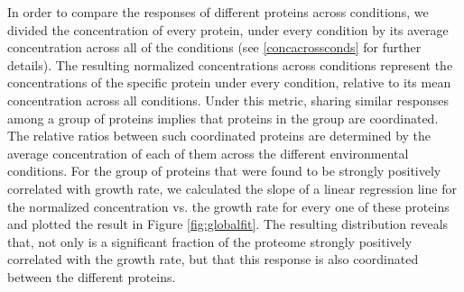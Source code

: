 In order to compare the responses of different proteins across conditions, we divided the concentration of every protein, under every condition by its average concentration across all of the conditions (see \ref{concacrossconds} for further details).
The resulting normalized concentrations across conditions represent the concentrations of the specific protein under every condition, relative to its mean concentration across all conditions.
Under this metric, sharing similar responses among a group of proteins implies that proteins in the group are coordinated.
The relative ratios between such coordinated proteins are determined by the average concentration of each of them across the different environmental conditions.
For the group of proteins that were found to be strongly positively correlated with growth rate, we calculated the slope of a linear regression line for the normalized concentration vs. the growth rate for every one of these proteins and plotted the result in Figure \ref{fig:globalfit}.
The resulting distribution reveals that, not only is a significant fraction of the proteome strongly positively correlated with the growth rate, but that this response is also coordinated between the different proteins.
